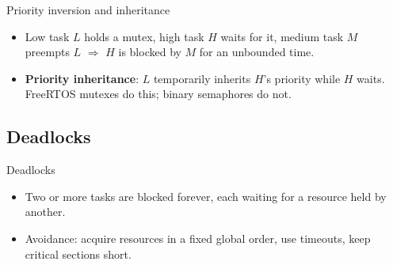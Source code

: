 \begin{frame}{Priority inversion and inheritance}
  \begin{itemize}
    \item Low task $L$ holds a mutex, high task $H$ waits for it, medium task $M$ preempts $L$ $\Rightarrow$ $H$ is blocked by $M$ for an unbounded time.
    \item \textbf{Priority inheritance}: $L$ temporarily inherits $H$'s priority while $H$ waits. FreeRTOS mutexes do this; binary semaphores do not.
  \end{itemize}
\end{frame}

\subsection{Deadlocks}
\begin{frame}{Deadlocks}
  \begin{itemize}
    \item Two or more tasks are blocked forever, each waiting for a resource held by another.
    \item Avoidance: acquire resources in a fixed global order, use timeouts, keep critical sections short.
  \end{itemize}
\end{frame}
